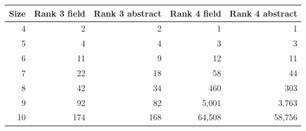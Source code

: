 \begin{tabular}{rrrrr}
\toprule
Size & Rank 3 field & Rank 3 abstract & Rank 4 field & Rank 4 abstract \\
\midrule
4 & 2 & 2 & 1 & 1 \\
5 & 4 & 4 & 3 & 3 \\
6 & 11 & 9 & 12 & 11 \\
7 & 22 & 18 & 58 & 44 \\
8 & 42 & 34 & 460 & 303 \\
9 & 92 & 82 & 5,001 & 3,763 \\
10 & 174 & 168 & 64,508 & 58,756 \\
\bottomrule
\end{tabular}
